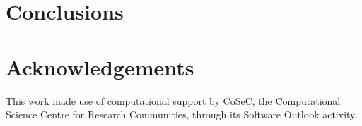 \documentclass[a4paper]{article}
\begin{document}
\section{Conclusions}\label{Sec:Conclusions}


\section*{Acknowledgements}
This work made use of computational support by CoSeC, the
Computational Science Centre for Research Communities, through its
Software Outlook activity.








\end{document}
